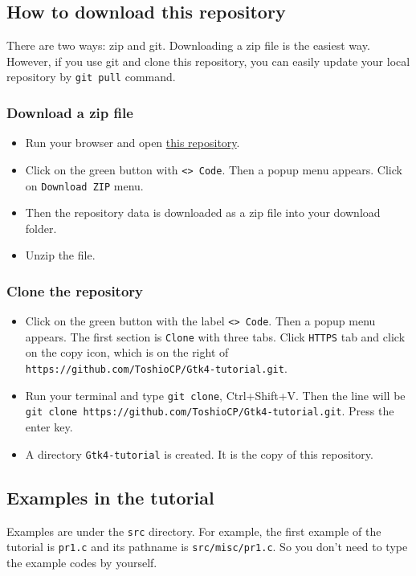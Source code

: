 \subsection{How to download this
repository}\label{how-to-download-this-repository}

There are two ways: zip and git. Downloading a zip file is the easiest
way. However, if you use git and clone this repository, you can easily
update your local repository by \passthrough{\lstinline!git pull!}
command.

\subsubsection{Download a zip file}\label{download-a-zip-file}

\begin{itemize}
\tightlist
\item
  Run your browser and open
  \href{https://github.com/ToshioCP/Gtk4-tutorial}{this repository}.
\item
  Click on the green button with \passthrough{\lstinline!<> Code!}. Then
  a popup menu appears. Click on \passthrough{\lstinline!Download ZIP!}
  menu.
\item
  Then the repository data is downloaded as a zip file into your
  download folder.
\item
  Unzip the file.
\end{itemize}

\subsubsection{Clone the repository}\label{clone-the-repository}

\begin{itemize}
\tightlist
\item
  Click on the green button with the label
  \passthrough{\lstinline!<> Code!}. Then a popup menu appears. The
  first section is \passthrough{\lstinline!Clone!} with three tabs.
  Click \passthrough{\lstinline!HTTPS!} tab and click on the copy icon,
  which is on the right of
  \passthrough{\lstinline!https://github.com/ToshioCP/Gtk4-tutorial.git!}.
\item
  Run your terminal and type \passthrough{\lstinline!git clone!},
  Ctrl+Shift+V. Then the line will be
  \passthrough{\lstinline!git clone https://github.com/ToshioCP/Gtk4-tutorial.git!}.
  Press the enter key.
\item
  A directory \passthrough{\lstinline!Gtk4-tutorial!} is created. It is
  the copy of this repository.
\end{itemize}

\subsection{Examples in the tutorial}\label{examples-in-the-tutorial}

Examples are under the \passthrough{\lstinline!src!} directory. For
example, the first example of the tutorial is
\passthrough{\lstinline!pr1.c!} and its pathname is
\passthrough{\lstinline!src/misc/pr1.c!}. So you don't need to type the
example codes by yourself.
